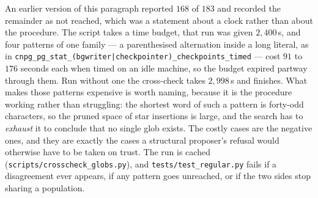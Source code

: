 \begin{remark}\label{rem:crosscheck-timing}
An earlier version of this paragraph reported $168$ of $183$ and recorded the remainder
as not reached, which was a statement about a clock rather than about the procedure. The
script takes a time budget, that run was given $2{,}400$\,s, and four patterns of one
family --- a parenthesised alternation inside a long literal, as in
\texttt{cnpg\_pg\_stat\_(bgwriter|checkpointer)\_checkpoints\_timed} --- cost $91$ to
$176$ seconds each when timed on an idle machine, so the budget expired partway through
them. Run without one the cross-check takes $2{,}998$\,s and finishes. What makes those
patterns expensive is worth naming, because it is the procedure working rather than
struggling: the shortest word of such a pattern is forty-odd characters, so the pruned
space of star insertions is large, and the search has to \emph{exhaust} it to conclude
that no single glob exists. The costly cases are the negative ones, and they are exactly
the cases a structural proposer's refusal would otherwise have to be taken on trust. The run is cached
(\texttt{scripts\slash crosscheck\_globs.py}), and \texttt{tests\slash test\_regular.py}
fails if a disagreement ever appears, if any pattern goes unreached, or if the two sides
stop sharing a population.
\end{remark}
